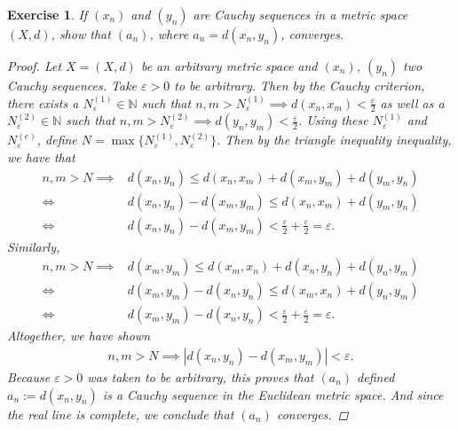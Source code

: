\documentclass[11pt]{article}
\theoremstyle{mystyle}
\newtheorem{protoexer}{Exercise}[section]
\newenvironment{exer}
{\colorlet{shadecolor}{blue!15}\begin{shaded}\begin{protoexer}}
{\end{protoexer}\end{shaded}}
\newcommand{\0}{\mathbf{0}}
\begin{document}
\begin{exer}\label{twocauchyconverge}
If $(x_n)$ and $(y_n)$ are Cauchy sequences in a metric space $(X, d)$, show that $(a_n)$, where $a_n = d(x_n, y_n)$, converges.
\begin{proof}
Let $X =(X, d)$ be an arbitrary metric space and $(x_n)$, $(y_n)$ two Cauchy sequences. Take $\varepsilon > 0$ to be arbitrary. Then by the Cauchy criterion, there exists a $N_{\varepsilon}^{(1)} \in \mathbb{N}$ such that $n, m > N_{\varepsilon}^{(1)} \implies d(x_n, x_m) < \frac{\varepsilon}{2}$ as well as a $N_{\varepsilon}^{(2)} \in \mathbb{N}$ such that $n, m > N_{\varepsilon}^{(2)} \implies d(y_n, y_m) < \frac{\varepsilon}{2}$. Using these $N_{\varepsilon}^{(1)}$ and $N_{\varepsilon}^{(e)}$, define $N = \max\{N_{\varepsilon}^{(1)}, N_{\varepsilon}^{(2)}\}$. Then by the triangle inequality inequality, we have that
\begin{align*}
    n, m > N \implies &d(x_n , y_n) \leq d(x_n, x_m) + d(x_m, y_m) + d(y_m, y_n)\\
    \iff& d(x_n, y_n) - d(x_m, y_m) \leq d(x_n, x_m) + d(y_m, y_n)\\
    \iff& d(x_n, y_n) - d(x_m, y_m) < \frac{\varepsilon}{2} +\frac{\varepsilon}{2} = \varepsilon.
\end{align*}
Similarly, 
\begin{align*}
     n, m > N \implies &d(x_m , y_m) \leq d(x_m, x_n) + d(x_n, y_n) + d(y_n, y_m)\\
     \iff&d(x_m , y_m) -  d(x_n, y_n)\leq d(x_m, x_n) + d(y_n, y_m)\\
     \iff& d(x_m , y_m) -  d(x_n, y_n) < \frac{\varepsilon}{2} +\frac{\varepsilon}{2} = \varepsilon.
\end{align*}
Altogether, we have shown
\begin{align*}
    n, m > N \implies |d(x_n, y_n) - d(x_m, y_m)| < \varepsilon.
\end{align*}
Because $\varepsilon > 0$ was taken to be arbitrary, this proves that $(a_n)$ defined $a_n := d(x_n, y_n)$ is a Cauchy sequence in the Euclidean metric space. And since the real line is complete, we conclude that $(a_n)$ converges.
\end{proof}
\end{exer}
    
\end{document}
